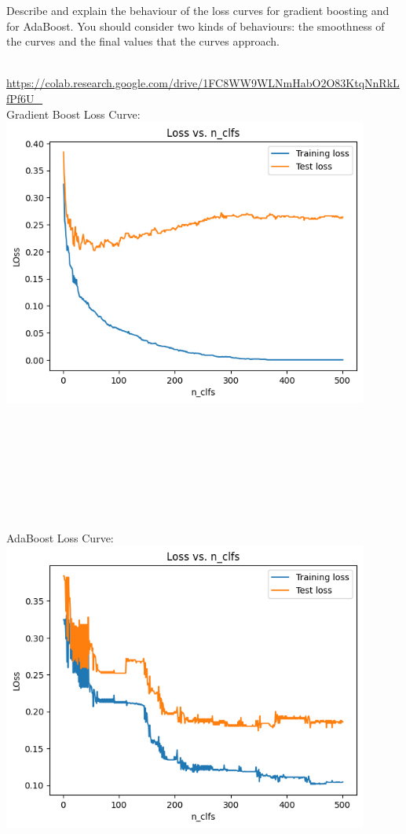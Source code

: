 \begin{problem}[2]
    Describe and explain the behaviour of the loss curves for gradient boosting and for AdaBoost. You should consider two kinds of behaviours: the smoothness of the curves and the final values that the curves approach.
\end{problem}

\begin{solution}
  \\
  \url{https://colab.research.google.com/drive/1FC8WW9WLNmHabO2O83KtqNnRkLfPf6U_} \\
  Gradient Boost Loss Curve: \\
  \includegraphics[width=12cm]{images/P3_H_grad_boost.png} \\
  \\ \\ \\ \\ \\ \\ \\ \\AdaBoost Loss Curve: \\
  \includegraphics[width=12cm]{images/P3_H_AdaBoost.png} \\

\end{solution}
